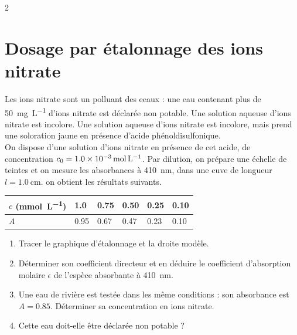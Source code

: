 \documentclass[a4paper,10pt,fleqn]{scrartcl}%
\begin{document}
	\maketitle
    \begin{multicols}{2}
    \section{Dosage par étalonnage des ions nitrate}
    Les ions nitrate  sont un polluant des eeaux : une eau contenant plus de \SI{50}{\mg\per\liter} d'ions nitrate est déclarée non potable. Une solution aqueuse d'ions nitrate est incolore. Une solution aqueuse d'ions nitrate est incolore, mais prend une soloration jaune en présence d'acide phénoldisulfonique.\\
    On dispose d'une solution d'ions nitrate en présence de cet acide, de concentration $c_0 = \SI{1,0E-3}{\mol\per\liter}$. Par dilution, on prépare une échelle de teintes et on mesure les absorbances à \SI{410}{\nm}, dans une cuve de longueur $l = \SI{1,0}{\cm}$. on obtient les résultats suivants.
    \begin{center}
        \begin{tabular}{|>{\centering}m{.16\linewidth}|>{\centering}m{.11\linewidth}|>{\centering}m{.11\linewidth}|>{\centering}m{.11\linewidth}|>{\centering}m{.11\linewidth}|>{\centering\arraybackslash}m{.11\linewidth}|}
            \hline
            $c$ (\unit{\milli\mol\per\liter}) & \num{1,0} & \num{0,75} & \num{0,50} & \num{0,25} & \num{0,10} \\
            \hline
            $A$ & \num{0,95} & \num{0,67} & \num{0,47} & \num{0,23} & \num{0,10} \\
            \hline
        \end{tabular}
    \end{center}
    \begin{enumerate}
        \item Tracer le graphique d'étalonnage et la droite modèle.
        \item Déterminer son coefficient directeur et en déduire le coefficient d'absorption molaire $\epsilon$ de l'espèce absorbante à \SI{410}{\nm}.
        \item Une eau de rivière est testée dans les même conditions : son absorbance est $A = \num{0,85}$. Déterminer sa concentration en ions nitrate.
        \item Cette eau doit-elle être déclarée non potable ?
    \end{enumerate}


\end{multicols}
\end{document}
